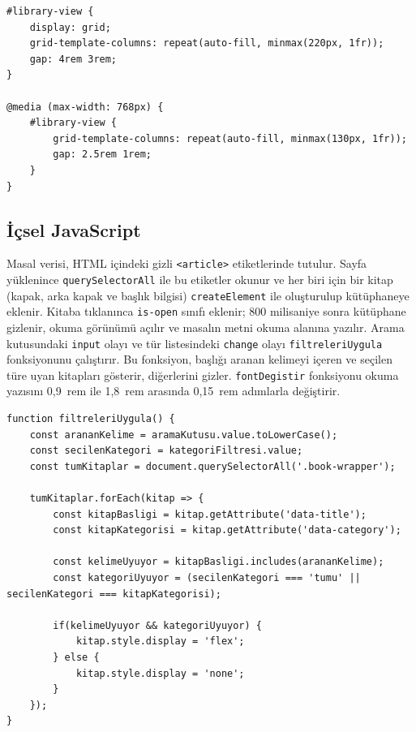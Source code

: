 \documentclass[12pt,a4paper]{article}
\begin{document}
\begin{lstlisting}[caption={İçsel CSS'ten önemli bir bölüm}]
#library-view {
    display: grid;
    grid-template-columns: repeat(auto-fill, minmax(220px, 1fr));
    gap: 4rem 3rem;
}

@media (max-width: 768px) {
    #library-view {
        grid-template-columns: repeat(auto-fill, minmax(130px, 1fr));
        gap: 2.5rem 1rem;
    }
}
\end{lstlisting}

\subsection{İçsel JavaScript}
Masal verisi, HTML içindeki gizli \texttt{<article>} etiketlerinde tutulur. Sayfa
yüklenince \texttt{querySelectorAll} ile bu etiketler okunur ve her biri için bir
kitap (kapak, arka kapak ve başlık bilgisi) \texttt{createElement} ile oluşturulup
kütüphaneye eklenir. Kitaba tıklanınca \texttt{is-open} sınıfı eklenir; 800 milisaniye
sonra kütüphane gizlenir, okuma görünümü açılır ve masalın metni okuma alanına
yazılır. Arama kutusundaki \texttt{input} olayı ve tür listesindeki \texttt{change}
olayı \texttt{filtreleriUygula} fonksiyonunu çalıştırır. Bu fonksiyon, başlığı aranan
kelimeyi içeren ve seçilen türe uyan kitapları gösterir, diğerlerini gizler.
\texttt{fontDegistir} fonksiyonu okuma yazısını 0,9~rem ile 1,8~rem arasında
0,15~rem adımlarla değiştirir.

\begin{lstlisting}[caption={İçsel JavaScript'ten önemli bir bölüm}]
function filtreleriUygula() {
    const arananKelime = aramaKutusu.value.toLowerCase();
    const secilenKategori = kategoriFiltresi.value;
    const tumKitaplar = document.querySelectorAll('.book-wrapper');

    tumKitaplar.forEach(kitap => {
        const kitapBasligi = kitap.getAttribute('data-title');
        const kitapKategorisi = kitap.getAttribute('data-category');

        const kelimeUyuyor = kitapBasligi.includes(arananKelime);
        const kategoriUyuyor = (secilenKategori === 'tumu' || secilenKategori === kitapKategorisi);

        if(kelimeUyuyor && kategoriUyuyor) {
            kitap.style.display = 'flex';
        } else {
            kitap.style.display = 'none';
        }
    });
}
\end{lstlisting}
\end{document}
